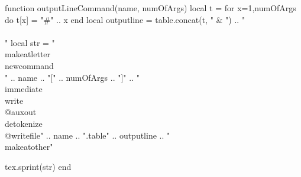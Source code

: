 \begin{luacode*}
function outputLineCommand(name, numOfArgs)
    local t = {}
    for x=1,numOfArgs do
        t[x] = "#" .. x
    end
    local outputline = table.concat(t, " & ") .. "\\\\"
    local str = "\\makeatletter\\newcommand{\\" .. name .. "}[" .. numOfArgs .. "]{"
        .. "\\immediate\\write\\@auxout{\\detokenize{\\@writefile{" .. name .. ".table}{"
        .. outputline
        .. "}}}}\\makeatother"

    tex.sprint(str)
end
\end{luacode*}

\newcommand{\newcollection}[4]
{
    \immediate\write\@auxout{\detokenize{\@writefile{#1.table}{\begin{tabularx}{\textwidth}{#3}}}}
    \immediate\write\@auxout{\noexpand\@writefile{#1.table}{#4 \string\\}}
    \AtEndDocument{\immediate\write\@auxout{\detokenize{\@writefile{#1.table}{\end{tabularx}}}}}

    \luadirect{outputLineCommand("#1", #2)}

    \expandafter\newcommand\csname #1TableOut\endcsname
    {
        \@starttoc{#1.table}
    }
}